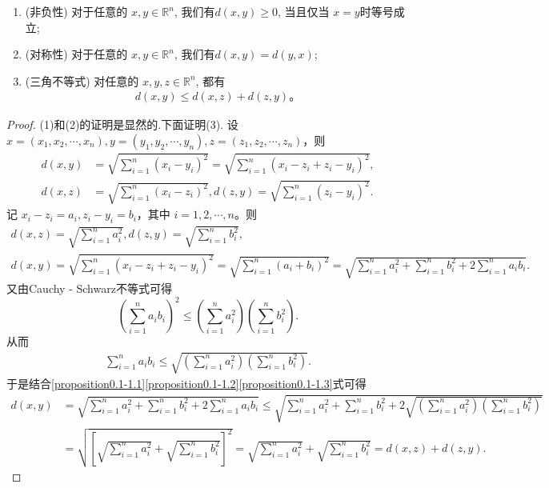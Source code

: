 \documentclass[../../main.tex]{subfiles}
\begin{document}
\begin{proposition}
\begin{enumerate}[(1)]
\item (非负性) 对于任意的 $x, y \in \mathbb{R}^n$, 我们有$d(x, y) \geqslant 0$, 当且仅当 $x = y$时等号成立;
\item (对称性) 对于任意的 $x, y \in \mathbb{R}^n$, 我们有$d(x, y) = d(y, x)$;
\item (三角不等式) 对任意的 $x, y, z \in \mathbb{R}^n$, 都有
\begin{align*}
d(x, y) \leqslant d(x, z) + d(z, y)。
\end{align*}
\end{enumerate}
\end{proposition}
\begin{proof}
(1)和(2)的证明是显然的.下面证明(3).
设 $x=(x_1,x_2,\cdots,x_n),y=(y_1,y_2,\cdots,y_n),z=(z_1,z_2,\cdots,z_n)$，则
\begin{align*}
d(x,y) &=\sqrt{\sum_{i = 1}^n (x_i - y_i)^2}=\sqrt{\sum_{i = 1}^n (x_i - z_i + z_i - y_i)^2},\\
d(x,z) &=\sqrt{\sum_{i = 1}^n (x_i - z_i)^2},d(z,y)=\sqrt{\sum_{i = 1}^n (z_i - y_i)^2}.
\end{align*}
记 $x_i - z_i = a_i,z_i - y_i = b_i$，其中 $i = 1,2,\cdots,n$。则
\begin{gather}
d(x,z) =\sqrt{\sum_{i = 1}^n a_{i}^{2}},d(z,y)=\sqrt{\sum_{i = 1}^n b_{i}^{2}},\label{proposition0.1-1.1}\\
d(x,y) =\sqrt{\sum_{i = 1}^n (x_i - z_i + z_i - y_i)^2}=\sqrt{\sum_{i = 1}^n (a_i + b_i)^2}=\sqrt{\sum_{i = 1}^n a_{i}^{2}+\sum_{i = 1}^n b_{i}^{2}+2\sum_{i = 1}^n a_ib_i}.\label{proposition0.1-1.2}
\end{gather}
又由Cauchy - Schwarz不等式可得
\[
(\sum_{i = 1}^n a_ib_i)^2\leqslant (\sum_{i = 1}^n a_{i}^{2})(\sum_{i = 1}^n b_{i}^{2}).
\]
从而
\begin{align}
\sum_{i = 1}^n a_ib_i\leqslant \sqrt{(\sum_{i = 1}^n a_{i}^{2})(\sum_{i = 1}^n b_{i}^{2})}.\label{proposition0.1-1.3}
\end{align}
于是结合\eqref{proposition0.1-1.1}\eqref{proposition0.1-1.2}\eqref{proposition0.1-1.3}式可得
\begin{align*}
d(x,y) &=\sqrt{\sum_{i = 1}^n a_{i}^{2}+\sum_{i = 1}^n b_{i}^{2}+2\sum_{i = 1}^n a_ib_i}\leqslant \sqrt{\sum_{i = 1}^n a_{i}^{2}+\sum_{i = 1}^n b_{i}^{2}+2\sqrt{(\sum_{i = 1}^n a_{i}^{2})(\sum_{i = 1}^n b_{i}^{2})}}\\
&=\sqrt{[\sqrt{\sum_{i = 1}^n a_{i}^{2}}+\sqrt{\sum_{i = 1}^n b_{i}^{2}}]^2}=\sqrt{\sum_{i = 1}^n a_{i}^{2}}+\sqrt{\sum_{i = 1}^n b_{i}^{2}}=d(x,z)+d(z,y).
\end{align*} 
\end{proof}
\end{document}
